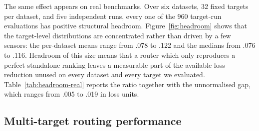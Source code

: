The same effect appears on real benchmarks. Over six datasets, 32 fixed targets
per dataset, and five independent runs, every one of the 960 target-run
evaluations has positive structural headroom. Figure~\ref{fig:headroom} shows
that the target-level distributions are concentrated rather than driven by a
few sensors: the per-dataset means range from .078 to .122 and the medians
from .076 to .116. Headroom of this size means that a router which only
reproduces a perfect standalone ranking leaves a measurable part of the
available loss reduction unused on every dataset and every target we evaluated.
Table~\ref{tab:headroom-real} reports the ratio together with the unnormalised
gap, which ranges from .005 to .019 in loss units.



\subsection{Multi-target routing performance}

